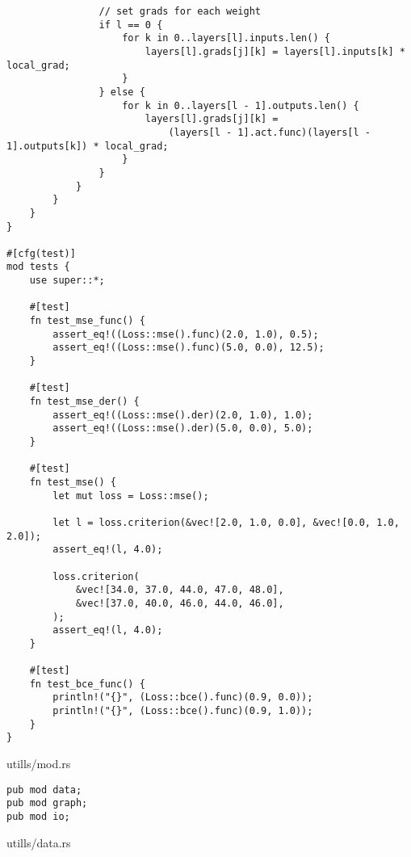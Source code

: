\begin{verbatim}
                // set grads for each weight
                if l == 0 {
                    for k in 0..layers[l].inputs.len() {
                        layers[l].grads[j][k] = layers[l].inputs[k] * local_grad;
                    }
                } else {
                    for k in 0..layers[l - 1].outputs.len() {
                        layers[l].grads[j][k] =
                            (layers[l - 1].act.func)(layers[l - 1].outputs[k]) * local_grad;
                    }
                }
            }
        }
    }
}

#[cfg(test)]
mod tests {
    use super::*;

    #[test]
    fn test_mse_func() {
        assert_eq!((Loss::mse().func)(2.0, 1.0), 0.5);
        assert_eq!((Loss::mse().func)(5.0, 0.0), 12.5);
    }

    #[test]
    fn test_mse_der() {
        assert_eq!((Loss::mse().der)(2.0, 1.0), 1.0);
        assert_eq!((Loss::mse().der)(5.0, 0.0), 5.0);
    }

    #[test]
    fn test_mse() {
        let mut loss = Loss::mse();

        let l = loss.criterion(&vec![2.0, 1.0, 0.0], &vec![0.0, 1.0, 2.0]);
        assert_eq!(l, 4.0);

        loss.criterion(
            &vec![34.0, 37.0, 44.0, 47.0, 48.0],
            &vec![37.0, 40.0, 46.0, 44.0, 46.0],
        );
        assert_eq!(l, 4.0);
    }

    #[test]
    fn test_bce_func() {
        println!("{}", (Loss::bce().func)(0.9, 0.0));
        println!("{}", (Loss::bce().func)(0.9, 1.0));
    }
}
\end{verbatim}
\noindent utills/mod.rs
\begin{verbatim}        
pub mod data;
pub mod graph;
pub mod io;
\end{verbatim}
\noindent utills/data.rs
